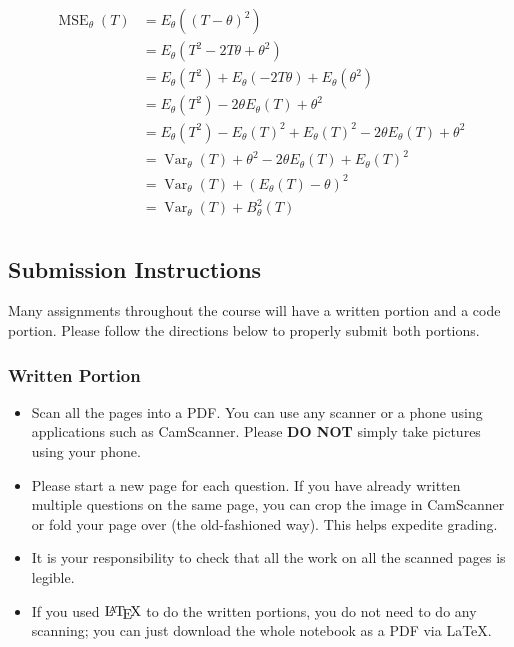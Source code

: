 \documentclass[11pt]{article}
\providecommand{\tightlist}{%
      \setlength{\itemsep}{0pt}\setlength{\parskip}{0pt}}
\DeclareMathOperator{\Var}{Var} %
\let\Oldlatex\LaTeX
\renewcommand{\LaTeX}{\textrm{\Oldlatex}}
\DeclareMathOperator{\MSE}{MSE}
\begin{document}
\begin{align*}
\MSE_{\theta}(T) &= E_{\theta}\left( (T-\theta)^{2} \right)  \\	
&= E_{\theta} \left( T^{2} - 2T\theta + \theta^{2} \right) \\
&= E_{\theta}(T^{2}) + E_{\theta}(-2T\theta) + E_{\theta}(\theta^{2}) \\
&= E_{\theta}(T^{2}) -2\theta E_{\theta}(T) + \theta^{2} \\
&= E_{\theta}(T^{2}) - E_{\theta}(T)^{2} + E_{\theta}(T)^{2} - 2\theta E_{\theta}(T) + \theta^{2} \\
&= \Var_{\theta}(T) + \theta^{2} - 2\theta E_{\theta}(T) + E_{\theta}(T)^{2} \\
&= \Var_{\theta}(T) + (E_{\theta}(T) - \theta)^{2}   \\
&= \Var_{\theta}(T) + B_{\theta}^{2}(T) \\
\end{align*}












\newpage
    \subsection*{Submission Instructions}\label{submission-instructions}

Many assignments throughout the course will have a written portion and a
code portion. Please follow the directions below to properly submit both
portions.

\subsubsection{Written Portion}\label{written-portion}

\begin{itemize}
\tightlist
\item
  Scan all the pages into a PDF. You can use any scanner or a phone
  using applications such as CamScanner. Please \textbf{DO NOT} simply
  take pictures using your phone.
\item
  Please start a new page for each question. If you have already written
  multiple questions on the same page, you can crop the image in
  CamScanner or fold your page over (the old-fashioned way). This helps
  expedite grading.
\item
  It is your responsibility to check that all the work on all the
  scanned pages is legible.
\item
  If you used \(\LaTeX\) to do the written portions, you do not need to
  do any scanning; you can just download the whole notebook as a PDF via
  LaTeX.
\end{itemize}
\end{document}
